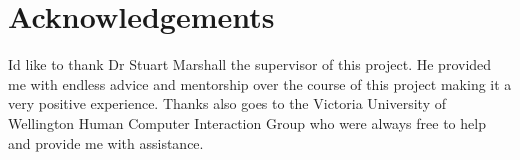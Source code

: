 \chapter*{Acknowledgements}
Id like to thank Dr Stuart Marshall the supervisor of this project. He provided me with endless advice and mentorship over the course of this project making it a very positive experience. Thanks also goes to the Victoria University of Wellington Human Computer Interaction Group who were always free to help and provide me with assistance.
